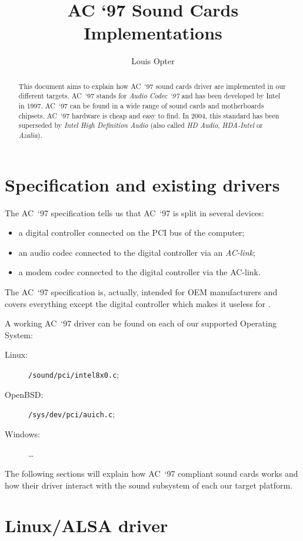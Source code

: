 \documentclass[a4paper,american]{rtxarticle}
\author{Louis Opter}
\title{AC `97 Sound Cards Implementations}
\begin{document}
\maketitle

\begin{abstract}
This document aims to explain how AC~`97 sound cards driver are implemented in
our different targets. AC~`97 stands for \emph{Audio Codec `97} and has been
developed by Intel in 1997. AC~`97 can be found in a wide range of sound cards
and motherboards chipsets. AC~`97 hardware is cheap and easy to find. In 2004,
this standard has been superseded by \emph{Intel High Definition Audio} (also
called \emph{HD Audio}, \emph{HDA-Intel} or \emph{Azalia}).
\end{abstract}

\section{Specification and existing drivers}

The AC~`97 specification tells us\cite[p. 11]{AC97spec} that AC~`97 is split in
several devices:
\begin{itemize}
\item a digital controller connected on the PCI bus of the computer;
\item an audio codec connected to the digital controller via an \emph{AC-link};
\item a modem codec connected to the digital controller via the AC-link.
\end{itemize}
The AC~`97 specification is, actually, intended for OEM manufacturers and covers
everything except the digital controller which makes it useless for \rtx.

A working AC~`97 driver can be found on each of our supported Operating System:
\begin{description}
\item[Linux:] \texttt{/sound/pci/intel8x0.c};
\item[OpenBSD:] \texttt{/sys/dev/pci/auich.c};
\item[Windows:] \ldots
\end{description}

The following sections will explain how AC~`97 compliant sound cards works and
how their driver interact with the sound subsystem of each our target platform.

\section{Linux/ALSA driver}
\end{document}
